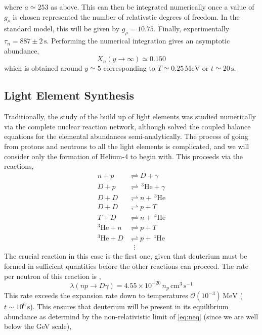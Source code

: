 \documentclass[11pt]{article}
\numberwithin{equation}{section}
\numberwithin{figure}{section}
\numberwithin{table}{section}
\newcommand{\mO}{\mathcal{O}}
\begin{document}
where $a \simeq 253$ as above. This can then be integrated numerically once a value of $g_\rho$ is chosen represented the number of relativstic degrees of freedom. In the standard model, this will be given by $g_\rho = 10.75$. Finally, experimentally $\tau_n = 887 \pm 2 \, \mathrm{s}$. Performing the numerical integration gives an asymptotic abundance,
\begin{equation}
X_n(y \rightarrow \infty) \simeq 0.150
\end{equation}
which is obtained around $y \simeq 5$ corresponding to $T \simeq 0.25 \, \mathrm{MeV}$ or $t \simeq 20 \, \mathrm{s}$.
\subsection{Light Element Synthesis}


Traditionally, the study of the build up of light elements was studied numerically via the complete nuclear reaction network, although \citet{Esmailzadeh:1990hf} solved the coupled balance equations for the elemental abundances semi-analytically. The process of going from protons and neutrons to all the light elements is complicated, and we will consider only the formation of Helium-4 to begin with. This proceeds via the reactions,
\begin{align*}
n + p &\rightleftharpoons D + \gamma \\
D + p &\rightleftharpoons \, ^{3}\mathrm{He} + \gamma \\
D + D &\rightleftharpoons n + \, ^{3}\mathrm{He} \\
D + D &\rightleftharpoons p + T \\
T + D &\rightleftharpoons n + \, ^{4}\mathrm{He} \\
^{3}\mathrm{He} + n &\rightleftharpoons p + T \\
^{3}\mathrm{He} + D &\rightleftharpoons p + \, ^{4}\mathrm{He} \\
& \, \, \, \, \vdots
\end{align*}
The crucial reaction in this case is the first one, given that deuterium must be formed in sufficient quantities before the other reactions can proceed. The rate per neutron of this reaction is \citep{Weinberg:1972kfs},
\begin{equation}
\lambda(np \rightarrow D \gamma) = 4.55 \times 10^{-20} \, n_p \, \mathrm{cm}^3 \, \mathrm{s}^{-1}
\end{equation}
This rate exceeds the expansion rate down to temperatures $\mO(10^{-3}) \, \mathrm{MeV}$ ($t \sim 10^6 \, \mathrm{s}$). This ensures that deuterium will be present in its equilibrium abundance as determind by the non-relativistic limit of \eqref{eq:neq} (since we are well below the GeV scale),
\end{document}
